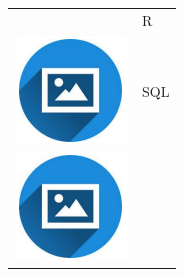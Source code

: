 \documentclass{article}
\begin{document}
\begin{paracol}{2}
\begin{tabular}{ll}
\begin{minipage}{0.1\linewidth}
         \end{minipage} & R \\[10pt]
         \begin{minipage}{0.1\linewidth}
         \includegraphics[width=\linewidth]{picon.png}
         \end{minipage} & SQL \\[10pt]
         \begin{minipage}{0.1\linewidth}
         \includegraphics[width=\linewidth]{picon.png}

\end{minipage}
\end{tabular}
\end{paracol}
\end{document}
